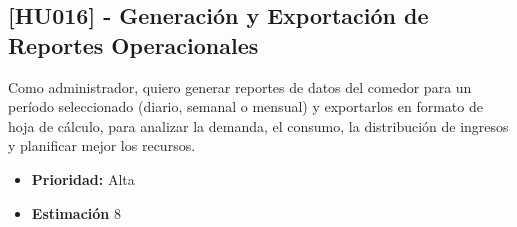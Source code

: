 \documentclass[12pt]{article}
\begin{document}
\pagebreak

\subsection{[HU016] - Generación y Exportación de Reportes Operacionales}

Como administrador, quiero generar reportes de datos del comedor para un período seleccionado (diario, semanal o mensual) y exportarlos en formato de hoja de cálculo, para analizar la demanda, el consumo, la distribución de ingresos y planificar mejor los recursos.

\begin{itemize}
	\item \textbf{Prioridad:} Alta
	\item \textbf{Estimación} 8
\end{itemize}
\end{document}
